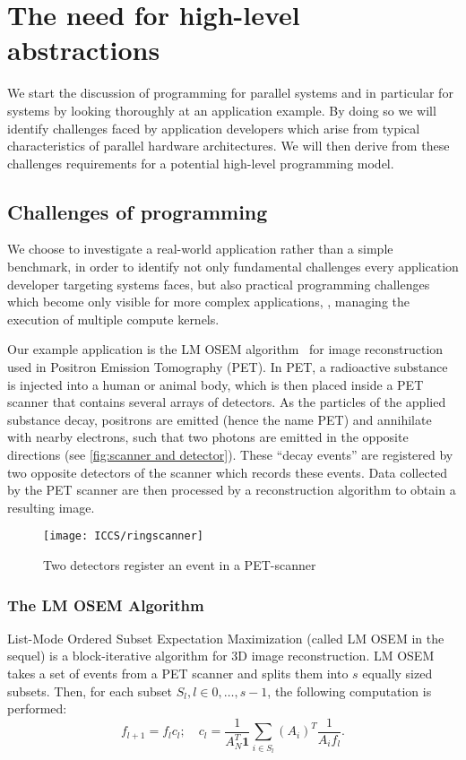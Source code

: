 \section{The need for high-level abstractions}
We start the discussion of programming for parallel systems and in particular for \GPU systems by looking thoroughly at an application example.
By doing so we will identify challenges faced by application developers which arise from typical characteristics of parallel hardware architectures.
We will then derive from these challenges requirements for a potential high-level programming model.


\subsection{Challenges of \GPU programming}
\label{section:opencl-example}
We choose to investigate a real-world application rather than a simple benchmark, in order to identify not only fundamental challenges every application developer targeting \GPU systems faces, but also practical programming challenges which become only visible for more complex applications, \eg, managing the execution of multiple compute kernels.

Our example application is the LM OSEM algorithm~\cite{ReaderErFlOt1998, SchellmannGoMeKoScWuBu2009} for image reconstruction used in Positron Emission Tomography (PET).
In PET, a radioactive substance is injected into a human or animal body, which is then placed inside a PET scanner that contains several arrays of detectors.
As the particles of the applied substance decay, positrons are emitted (hence the name PET) and annihilate with nearby electrons, such that two photons are emitted in the opposite directions (see \autoref{fig:scanner and detector}).
These ``decay events'' are registered by two opposite detectors of the scanner which records these events.
Data collected by the PET scanner are then processed by a reconstruction algorithm to obtain a resulting image.

\begin{figure}
  \centering
  \texttt{[image: ICCS/ringscanner]}
  \caption{Two detectors register an event in a PET-scanner}
  \label{fig:scanner and detector}
\end{figure}

\subsubsection{The LM OSEM Algorithm}
List-Mode Ordered Subset Expectation Maximization \cite{ReaderErFlOt1998} (called LM OSEM in the sequel) is a block-iterative algorithm for 3D image reconstruction.
LM OSEM takes a set of events from a PET scanner and splits them into $s$ equally sized subsets.
Then, for each subset $S_l, l \in {0, \ldots, s-1}$, the following computation is performed:
\begin{equation}
  f_{l+1}=f_{l}c_{l};\quad c_{l}=\dfrac{1}{A_N^T \textbf{1}} \sum_{i \in S_{l}} (A_i)^T \dfrac{1}{A_{i} f_{l}}.
\label{equ:lm_osem}
\end{equation}

